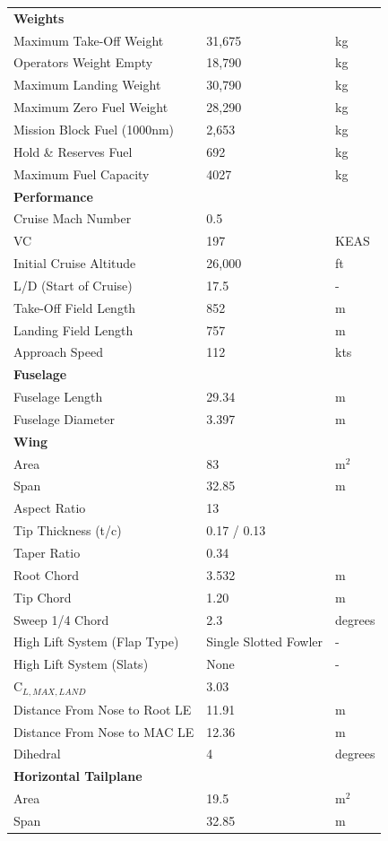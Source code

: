 \documentclass[11pt]{article}
\begin{document}
\begin{center}
\begin{longtable}{lll}
\midrule
\textbf{Weights}\\
Maximum Take-Off Weight&31,675&kg\\
Operators Weight Empty&18,790&kg\\
Maximum Landing Weight&30,790&kg\\
Maximum Zero Fuel Weight&28,290&kg\\
Mission Block Fuel (1000nm)&2,653&kg\\
Hold \& Reserves Fuel&692&kg\\
Maximum Fuel Capacity&4027&kg\\
\midrule
\textbf{Performance}\\
Cruise Mach Number & 0.5 &\\
VC & 197 &KEAS\\
Initial Cruise Altitude & 26,000&ft \\
L/D (Start of Cruise) & 17.5 & -\\
Take-Off Field Length & 852 &m\\
Landing Field Length & 757 &m\\
Approach Speed & 112 & kts\\
\midrule
\textbf{Fuselage}\\
Fuselage Length &29.34 & m\\
Fuselage Diameter &3.397 &m\\
\midrule
\textbf{Wing}\\
Area & 83 & m$^{2}$\\
Span & 32.85 & m\\
Aspect Ratio & 13 &\\
Tip Thickness (t/c) & 0.17 / 0.13& \\
Taper Ratio & 0.34 & \\
Root Chord & 3.532 &m\\
Tip Chord & 1.20 &m\\
Sweep 1/4 Chord & 2.3 & degrees\\
High Lift System (Flap Type) &Single Slotted Fowler&-\\
High Lift System (Slats) & None&-\\
C$_{L,MAX,LAND}$ & 3.03&\\
Distance From Nose to Root LE & 11.91 & m \\
Distance From Nose to MAC LE & 12.36 &m\\
Dihedral & 4 & degrees \\
\midrule
\textbf{Horizontal Tailplane}\\
Area & 19.5 &m$^{2}$\\
Span & 32.85 & m\\

\end{longtable}
\end{center}
\end{document}
